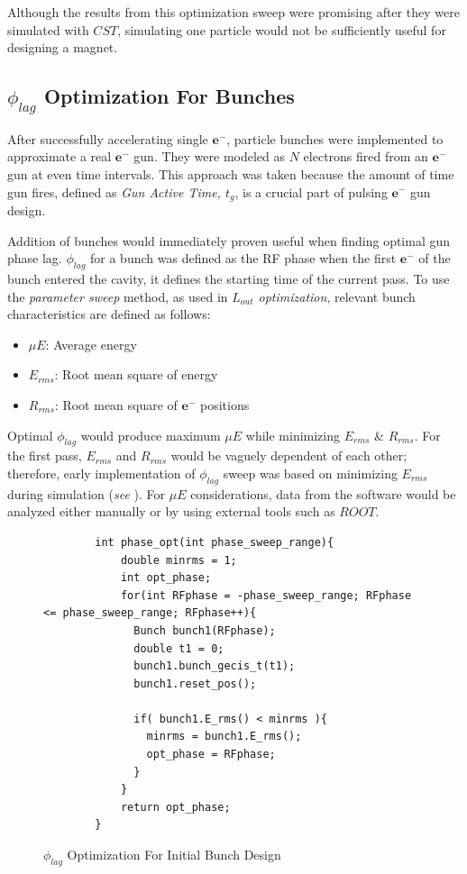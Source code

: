 \documentclass[a4paper,oneside,12pt]{report}
\numberwithin{equation}{chapter}
\begin{document}
Although the results from this optimization sweep were promising after they were simulated with $CST$, simulating one particle would not be sufficiently useful for designing a magnet.

\subsection{$\phi_{lag}$ Optimization For Bunches}
After successfully accelerating single $\textbf{e}^-$, particle bunches were implemented to approximate a real $\textbf{e}^-$ gun. 
They were modeled as $N$ electrons fired from an $\textbf{e}^-$ gun at even time intervals. This approach was taken because the amount of time gun fires, defined as \textit{Gun Active Time, $t_g$}, is a crucial part of pulsing $\textbf{e}^-$ gun design.

Addition of bunches would immediately proven useful when finding optimal gun phase lag.
$\phi_{lag}$ for a bunch was defined as the RF phase when the first $\textbf{e}^-$ of the bunch entered the cavity, it defines the starting time of the current pass.
To use the \textit{parameter sweep} method, as used in \textit{$L_{out}$ optimization}, relevant bunch characteristics are defined as follows:

\begin{itemize}
    \item $\mu E$: Average energy
    \item $E_{rms}$: Root mean square of energy
    \item $R_{rms}$: Root mean square of $\textbf{e}^-$ positions
\end{itemize}

Optimal $\phi_{lag}$ would produce maximum $\mu E$ while minimizing $E_{rms}$ \& $R_{rms}$. For the first pass, 
$E_{rms}$ and $R_{rms}$ would be vaguely dependent of each other; therefore, early implementation of $\phi_{lag}$ sweep was based on minimizing $E_{rms}$ during simulation (\textit{see }). 
For $\mu E$ considerations, data from the software would be analyzed either manually or by using external tools such as $ROOT$. 

\begin{figure}[H]
    \centering
    \captionsetup{justification=centering}
    \begin{verbatim}
        int phase_opt(int phase_sweep_range){
            double minrms = 1;
            int opt_phase;
            for(int RFphase = -phase_sweep_range; RFphase <= phase_sweep_range; RFphase++){
              Bunch bunch1(RFphase);
              double t1 = 0;
              bunch1.bunch_gecis_t(t1);
              bunch1.reset_pos();
        
              if( bunch1.E_rms() < minrms ){
                minrms = bunch1.E_rms();
                opt_phase = RFphase;
              }
            }
            return opt_phase;
        }
    \end{verbatim}
    \caption{$\phi_{lag}$ Optimization For Initial Bunch Design}
    \label{fig:phlag_opt}
\end{figure}
\end{document}

